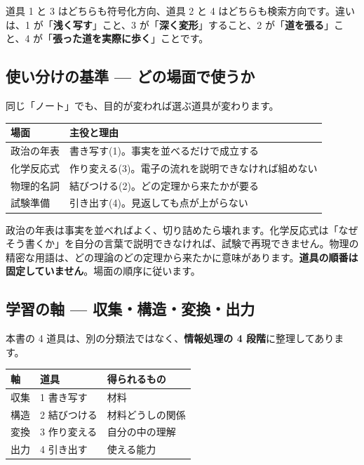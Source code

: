 \documentclass{article}
\begin{document}
道具 1 と 3 はどちらも符号化方向、道具 2 と 4 はどちらも検索方向です。違いは、1 が「\textbf{浅く写す}」こと、3 が「\textbf{深く変形}」すること、2 が「\textbf{道を張る}」こと、4 が「\textbf{張った道を実際に歩く}」ことです。

\subsection{使い分けの基準 — どの場面で使うか}

同じ「ノート」でも、目的が変われば選ぶ道具が変わります。

\begin{center}
\begin{tabular}{|l|l|}
\hline
場面 & 主役と理由 \\
\hline
政治の年表 & 書き写す(1)。事実を並べるだけで成立する \\
\hline
化学反応式 & 作り変える(3)。電子の流れを説明できなければ組めない \\
\hline
物理的名詞 & 結びつける(2)。どの定理から来たかが要る \\
\hline
試験準備 & 引き出す(4)。見返しても点が上がらない \\
\hline
\end{tabular}
\end{center}

政治の年表は事実を並べればよく、切り詰めたら壊れます。化学反応式は「なぜそう書くか」を自分の言葉で説明できなければ、試験で再現できません。物理の精密な用語は、どの理論のどの定理から来たかに意味があります。\textbf{道具の順番は固定していません}。場面の順序に従います。

\subsection{学習の軸 — 収集・構造・変換・出力}

本書の 4 道具は、別の分類法ではなく、\textbf{情報処理の 4 段階}に整理してあります。

\begin{center}
\begin{tabular}{|l|l|l|}
\hline
軸 & 道具 & 得られるもの \\
\hline
収集 & 1 書き写す & 材料 \\
\hline
構造 & 2 結びつける & 材料どうしの関係 \\
\hline
変換 & 3 作り変える & 自分の中の理解 \\
\hline
出力 & 4 引き出す & 使える能力 \\
\hline
\end{tabular}
\end{center}
\end{document}
